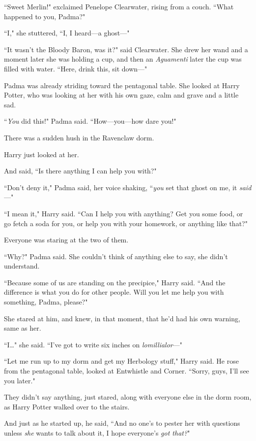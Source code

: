 ``Sweet Merlin!" exclaimed Penelope Clearwater, rising from a couch. ``What happened to you, Padma?"

``I," she stuttered, ``I, I heard---a ghost---"

``It wasn't the Bloody Baron, was it?" said Clearwater. She drew her wand and a moment later she was holding a cup, and then an \emph{Aguamenti} later the cup was filled with water. ``Here, drink this, sit down---"

Padma was already striding toward the pentagonal table. She looked at Harry Potter, who was looking at her with his own gaze, calm and grave and a little sad.

``\emph{You} did this!" Padma said. ``How---you---how dare you!"

There was a sudden hush in the Ravenclaw dorm.

Harry just looked at her.

And said, ``Is there anything I can help you with?"

``Don't deny it," Padma said, her voice shaking, ``\emph{you} set that ghost on me, it \emph{said}---"

``I mean it," Harry said. ``Can I help you with anything? Get you some food, or go fetch a soda for you, or help you with your homework, or anything like that?"

Everyone was staring at the two of them.

``Why?" Padma said. She couldn't think of anything else to say, she didn't understand.

``Because some of us are standing on the precipice," Harry said. ``And the difference is what you do for other people. Will you let me help you with something, Padma, please?"

She stared at him, and knew, in that moment, that he'd had his own warning, same as her.

``I{\ldots}" she said. ``I've got to write six inches on \emph{lomillialor}---"

``Let me run up to my dorm and get my Herbology stuff," Harry said. He rose from the pentagonal table, looked at Entwhistle and Corner. ``Sorry, guys, I'll see you later."

They didn't say anything, just stared, along with everyone else in the dorm room, as Harry Potter walked over to the stairs.

And just as he started up, he said, ``And no one's to pester her with questions unless \emph{she} wants to talk about it, I hope everyone's \emph{got that?}"


